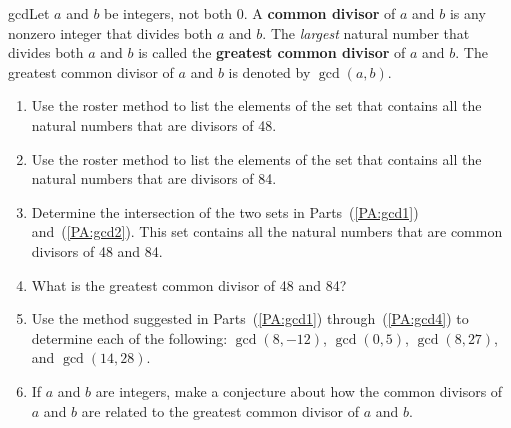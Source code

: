 \begin{previewactivity} \label{PA:gcd} \hfill
\begin{defbox}{gcd}{Let  $a$  and  $b$  be integers, not both 0. A \textbf{common divisor}
%
 of  $a$  and  $b$  is any nonzero integer that divides both  $a$  and  $b$.  The \emph{largest} natural number that divides both  $a$  and  $b$  is called the \textbf{greatest common divisor}
%
  of  $a$  and  $b$.  The greatest common divisor of  $a$  and  $b$  is denoted by  $\gcd \left( {a, b} \right)$.
\label{sym:gcd}}
\end{defbox}

\begin{enumerate}
\item Use the roster method to list the elements of the set that contains all the natural numbers that are divisors of 48. \label{PA:gcd1}

\item Use the roster method to list the elements of the set that contains all the natural numbers that are divisors of 84. \label{PA:gcd2}

\item Determine the intersection of the two sets in Parts~(\ref{PA:gcd1}) and~(\ref{PA:gcd2}).  This set contains all the natural numbers that are common divisors of  48  and  84. 

\item What is the greatest common divisor of  48  and  84?  
\label{PA:gcd4}%

\item Use the method suggested in Parts~(\ref{PA:gcd1}) through~(\ref{PA:gcd4}) to determine each of the following:  $\gcd( {8,  - 12}) $, 
$\gcd( {0, 5} )$, $\gcd( {8, 27} )$, and $\gcd( {14, 28})$.  
\label{PA:gcd5}%

\item If $a$ and $b$ are integers, make a conjecture about how the common divisors of  $a$  and  $b$  are related to the greatest common divisor of  $a$  and  $b$.
\end{enumerate}
\end{previewactivity}
\hbreak
%
